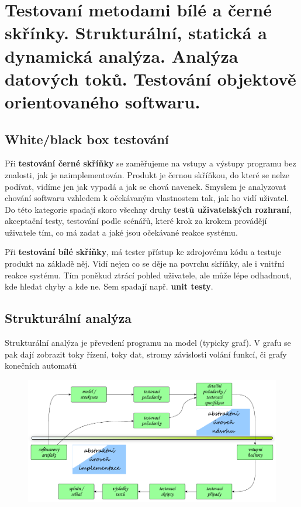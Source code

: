 \section[TVS]{Testovaní metodami bílé a černé skřínky. Strukturální, statická a dynamická analýza. Analýza datových toků. Testování objektově orientovaného softwaru.}

\subsection{White/black box testování}

Při \textbf{testování černé skříňky} se zaměřujeme na vstupy a výstupy programu bez znalosti, jak je naimplementován. Produkt je černou skříňkou, do které se nelze podívat, vidíme jen jak vypadá a jak se chová navenek. Smyslem je analyzovat chování softwaru vzhledem k očekávaným vlastnostem tak, jak ho vidí uživatel. Do této kategorie spadají skoro všechny druhy \textbf{testů uživatelských rozhraní}, akceptační testy, testování podle scénářů, které krok za krokem provádějí uživatele tím, co má zadat a jaké jsou očekávané reakce systému.

Při \textbf{testování bílé skříňky}, má tester přístup ke zdrojovému kódu a testuje produkt na základě něj. Vidí nejen co se děje na povrchu skříňky, ale i vnitřní reakce systému. Tím poněkud ztrácí pohled uživatele, ale může lépe odhadnout, kde hledat chyby a kde ne. Sem spadají např. \textbf{unit testy}.

\subsection{Strukturální analýza}

Strukturální analýza je převedení programu na model (typicky graf). V grafu se pak dají zobrazit toky řízení, toky dat, stromy závislosti volání funkcí, či grafy konečních automatů

\begin{figure}[h!]
\centering
\includegraphics[width=130mm]{14/images/test-model}
\end{figure}

